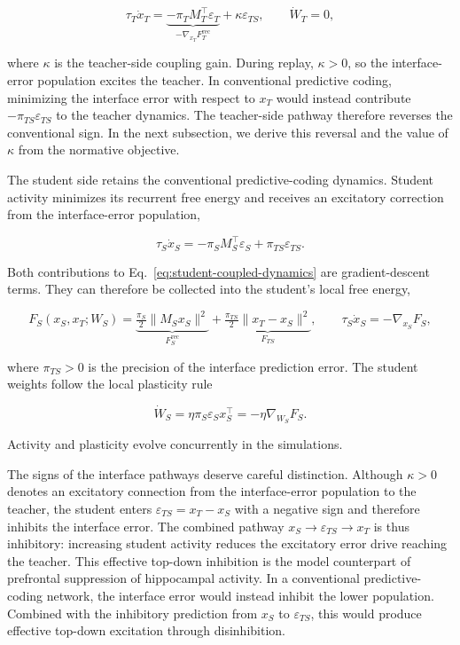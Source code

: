 \documentclass[10pt,letterpaper]{article}
\theoremstyle{plain}
\theoremstyle{remark}
\begin{document}
\begin{equation}
\tau_T\dot x_T
=
\underbrace{-\pi_TM_T^\top\varepsilon_T}_{-\nabla_{x_T}F_T^{\mathrm{rec}}}
+\kappa\varepsilon_{TS},
\qquad
\dot W_T=0,
\label{eq:teacher-coupled-dynamics}
\end{equation}

where $\kappa$ is the teacher-side coupling gain. During replay, $\kappa>0$, so the interface-error population excites the teacher. In conventional predictive coding, minimizing the interface error with respect to $x_T$ would instead contribute $-\pi_{TS}\varepsilon_{TS}$ to the teacher dynamics. The teacher-side pathway therefore reverses the conventional sign. In the next subsection, we derive this reversal and the value of $\kappa$ from the normative objective.

The student side retains the conventional predictive-coding dynamics. Student activity minimizes its recurrent free energy and receives an excitatory correction from the interface-error population,

\begin{equation}
\tau_S\dot x_S
=
-\pi_SM_S^\top\varepsilon_S
+\pi_{TS}\varepsilon_{TS}.
\label{eq:student-coupled-dynamics}
\end{equation}

Both contributions to Eq.~\eqref{eq:student-coupled-dynamics} are gradient-descent terms. They can therefore be collected into the student's local free energy,

\begin{equation}
F_S(x_S,x_T;W_S)
=
\underbrace{\tfrac{\pi_S}{2}\|M_Sx_S\|^2}_{F_S^{\mathrm{rec}}}
+
\underbrace{\tfrac{\pi_{TS}}{2}\|x_T-x_S\|^2}_{F_{TS}},
\qquad
\tau_S\dot x_S=-\nabla_{x_S}F_S,
\label{eq:student-energy}
\end{equation}

where $\pi_{TS}>0$ is the precision of the interface prediction error. The student weights follow the local plasticity rule

\begin{equation}
\dot W_S=\eta\pi_S\varepsilon_Sx_S^\top=-\eta\nabla_{W_S}F_S.
\label{eq:student-plasticity}
\end{equation}

Activity and plasticity evolve concurrently in the simulations.

The signs of the interface pathways deserve careful distinction. Although $\kappa>0$ denotes an excitatory connection from the interface-error population to the teacher, the student enters $\varepsilon_{TS}=x_T-x_S$ with a negative sign and therefore inhibits the interface error. The combined pathway $x_S\rightarrow\varepsilon_{TS}\rightarrow x_T$ is thus inhibitory: increasing student activity reduces the excitatory error drive reaching the teacher. This effective top-down inhibition is the model counterpart of prefrontal suppression of hippocampal activity. In a conventional predictive-coding network, the interface error would instead inhibit the lower population. Combined with the inhibitory prediction from $x_S$ to $\varepsilon_{TS}$, this would produce effective top-down excitation through disinhibition.
\end{document}
